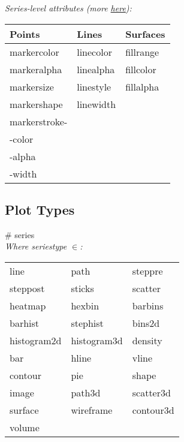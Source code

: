 \textit{Series-level attributes (more \href{https://docs.juliaplots.org/latest/generated/attributes\_series/}{here}):}\\
{\scriptsize
\begin{tabular}{l l l}
    Points                  & Lines          & Surfaces \\ \hline
    markercolor             & linecolor     & fillrange \\
    markeralpha             & linealpha     & fillcolor \\
    markersize              & linestyle     & fillalpha \\
    markershape             & linewidth     & \\
    markerstroke-           & \\
    \phantom{xxxx}-color    & \\
    \phantom{xxxx}-alpha    & \\
    \phantom{xxxx}-width    & \\
\end{tabular}
}

\subsection*{Plot Types}
 \# series \\
\textit{Where seriestype $\in$:}\\
{\scriptsize
\begin{tabular}{l l l}
    line        & path          & steppre \\
    steppost    & sticks        & scatter \\
    heatmap     & hexbin        & barbins \\
    barhist     & stephist      & bins2d \\
    histogram2d & histogram3d   & density \\
    bar         & hline         & vline \\
    contour     & pie           & shape \\
    image       & path3d        & scatter3d \\
    surface     & wireframe     & contour3d \\
    volume  \\
\end{tabular}
}


